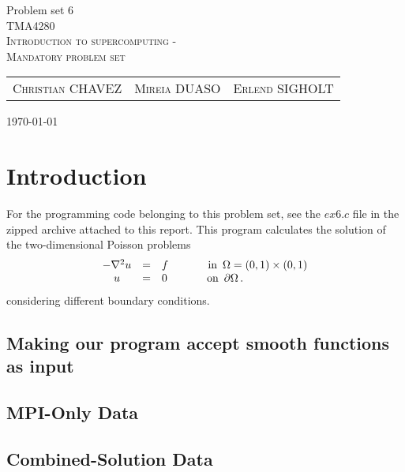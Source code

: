 \documentclass[fontsize=11pt,paper=a4,titlepage]{report}
\begin{document}
\begin{center}


{\huge Problem set 6}\\[0.5cm]

\textsc{\LARGE TMA4280}\\[0.5cm]
\textsc{\large Introduction to supercomputing -}\\
\textsc{\large Mandatory problem set}\\[0.6cm]

\begin{table}[h]
\centering
\begin{tabular}{ccc}
	\textsc{Christian CHAVEZ}	&	\textsc{Mireia DUASO}	&	\textsc{Erlend SIGHOLT}
\end{tabular}
\end{table}

\large{\today}
\vfill
\end{center}


\addtocounter{chapter}{1}

\clearpage
\section{Introduction}

For the programming code belonging to this problem set, see the $\textit{ex6.c}$
file in the zipped archive attached to this report. This program calculates the
solution of the two-dimensional Poisson problems
$$
\begin{array}{c l l}
- \nabla^{2} u & = & f \hspace{.5in} \textrm{in} \,\,\, \Omega = (0,1)\times (0,1) \\
u & = & 0 \hspace{.5in} \textrm{on} \,\,\, \partial\Omega\, .
\end{array}
$$
considering different boundary conditions.

\subsection{Making our program accept smooth functions as input }


\subsection{MPI-Only Data}

\subsection{Combined-Solution Data}
\end{document}
